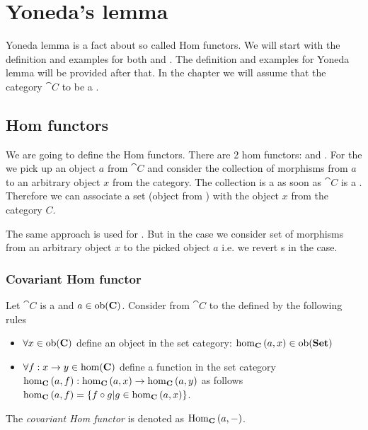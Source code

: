 \chapter{Yoneda's lemma}
\label{sec:yoneda}
Yoneda lemma is a fact about so called Hom functors. We will start
with the definition and examples for both
 and . The
definition and examples for Yoneda lemma will be provided after that. 
In the chapter we will assume that the category $\cat{C}$ to be a
.

\section{Hom functors}

We are going to define the Hom functors. There are 2 hom functors:
 and
. For the
 we pick up an object $a$ from 
$\cat{C}$ and consider the collection of morphisms from $a$ to an
arbitrary object $x$ from the category. The collection is a
 as soon as $\cat{C}$ is a
. Therefore we can associate a
set (object from ) with the object $x$ from the
category $C$. 

The same approach is used for 
. But in the case we consider set of
morphisms from an arbitrary object $x$ to the picked object $a$ i.e.
we revert s in the case.

\subsection{Covariant Hom functor}
\begin{definition}
\label{def:cov_hom_functor}
Let $\cat{C}$ is a  and $a \in
\mathrm{ob}(\mathbf{C})$. Consider  from $\cat{C}$ to the
 defined by the following rules
\begin{itemize}
\item $\forall x \in \mathrm{ob}(\mathbf{C})$ define an object in the set category:
  $\catmset[C]{a}{x} \in \catob{Set}$ 
\item $\forall f: x \to y \in \mathrm{hom}(\mathbf{C})$ define a function in the set category
  $\catmset[C]{a}{f}: \catmset[C]{a}{x} \to \catmset[C]{a}{y}$ as follows
  $\catmset[C]{a}{f} = \{f \circ g | g \in \catmset[C]{a}{x}\}$.
\end{itemize}  
The \textit{covariant Hom functor} is denoted as $\mathrm{Hom}_{\mathbf{C}}\left(a, -\right)$.
\end{definition}

